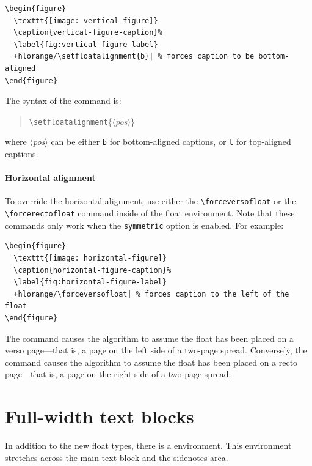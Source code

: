 \documentclass[a4paper]{tufte-handout}
\newcommand{\hlorange}[1]{\textcolor{tufte-orange}{#1}}
\newcommand{\doccmd}[1]{\hlorange{\texttt{\textbackslash#1}}}
\newcommand{\docopt}[1]{\( \langle \)\textrm{\textit{#1}}\( \rangle \)}
\newcommand{\docclsopt}[1]{\hlorange{\texttt{#1}}}
\newenvironment{docspec}
  {\begin{quotation}\ttfamily\parskip0pt\parindent0pt\ignorespaces}
  {\end{quotation}}
\begin{document}
\begin{Verbatim}[commandchars=+/|]
\begin{figure}
  \texttt{[image: vertical-figure]}
  \caption{vertical-figure-caption}%
  \label{fig:vertical-figure-label}
  +hlorange/\setfloatalignment{b}| % forces caption to be bottom-aligned
\end{figure}
\end{Verbatim}

\noindent The syntax of the  command is:

\begin{docspec}
  \doccmd{setfloatalignment}\{\docopt{pos}\}
\end{docspec}

\noindent where \docopt{pos} can be either \texttt{b} for bottom-aligned captions, or \texttt{t} for top-aligned captions.

\paragraph{Horizontal alignment}\label{par:horizontal-alignment}
To override the horizontal alignment, use either the \doccmd{forceversofloat} or the \doccmd{forcerectofloat} command inside of the float environment.
Note that these commands only work when the \docclsopt{symmetric} option is enabled.
For example:

\begin{Verbatim}[commandchars=+/|]
\begin{figure}
  \texttt{[image: horizontal-figure]}
  \caption{horizontal-figure-caption}%
  \label{fig:horizontal-figure-label}
  +hlorange/\forceversofloat| % forces caption to the left of the float
\end{figure}
\end{Verbatim}

\noindent The  command causes the algorithm to assume the float has been placed on a verso page---that is, a page on the left side of a two-page spread.
Conversely, the  command causes the algorithm to assume the float has been placed on a recto page---that is, a page on the right side of a two-page spread.


\section{Full-width text blocks}
In addition to the new float types, there is a  environment.
This environment stretches across the main text block and the sidenotes area.
\end{document}
